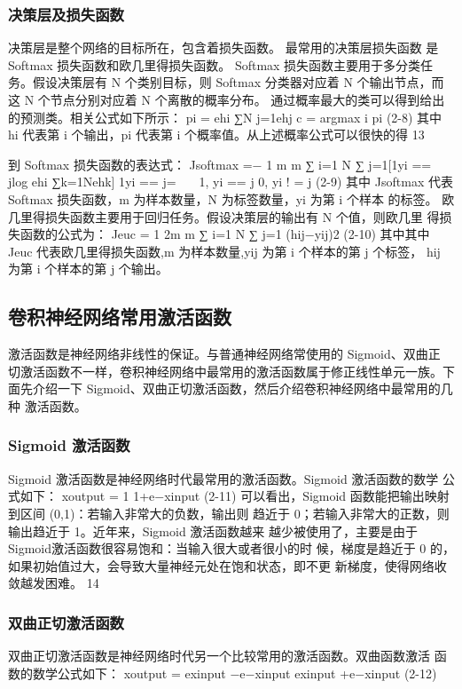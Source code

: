 \subsubsection{决策层及损失函数}
决策层是整个网络的目标所在，包含着损失函数。
最常用的决策层损失函数 是 Softmax 损失函数和欧几里得损失函数。
 Softmax 损失函数主要用于多分类任务。假设决策层有 N 个类别目标，则 Softmax 分类器对应着 N 个输出节点，而这 N 个节点分别对应着 N 个离散的概率分布。 通过概率最大的类可以得到给出的预测类。相关公式如下所示：
pi =
ehi ∑N j=1ehj c = argmax i pi
(2-8)
其中 hi 代表第 i 个输出，pi 代表第 i 个概率值。从上述概率公式可以很快的得
13

到 Softmax 损失函数的表达式：
Jsoftmax =−
1 m
m ∑ i=1
N ∑ j=1[1{yi == j}log ehi ∑k=1Nehk]
1{yi == j}=  
1, yi == j 0, yi ! = j
(2-9)
其中 Jsoftmax 代表 Softmax 损失函数，m 为样本数量，N 为标签数量，yi 为第 i 个样本 的标签。 欧几里得损失函数主要用于回归任务。假设决策层的输出有 N 个值，则欧几里 得损失函数的公式为：
Jeuc =
1 2m
m ∑ i=1
N ∑ j=1
(hij−yij)2 (2-10)
其中其中 Jeuc 代表欧几里得损失函数,m 为样本数量,yij 为第 i 个样本的第 j 个标签， hij 为第 i 个样本的第 j 个输出。

\subsection{卷积神经网络常用激活函数}
激活函数是神经网络非线性的保证。与普通神经网络常使用的 Sigmoid、双曲正 切激活函数不一样，卷积神经网络中最常用的激活函数属于修正线性单元一族。下 面先介绍一下 Sigmoid、双曲正切激活函数，然后介绍卷积神经网络中最常用的几种 激活函数。
\subsubsection{Sigmoid 激活函数}
Sigmoid 激活函数是神经网络时代最常用的激活函数。Sigmoid 激活函数的数学 公式如下：
xoutput =
1 1+e−xinput
(2-11)
可以看出，Sigmoid 函数能把输出映射到区间 (0,1)：若输入非常大的负数，输出则 趋近于 0；若输入非常大的正数，则输出趋近于 1。近年来，Sigmoid 激活函数越来 越少被使用了，主要是由于Sigmoid激活函数很容易饱和：当输入很大或者很小的时 候，梯度是趋近于 0 的，如果初始值过大，会导致大量神经元处在饱和状态，即不更 新梯度，使得网络收敛越发困难。
14

\subsubsection{双曲正切激活函数}
双曲正切激活函数是神经网络时代另一个比较常用的激活函数。双曲函数激活 函数的数学公式如下：
xoutput =
exinput −e−xinput exinput +e−xinput
(2-12)

